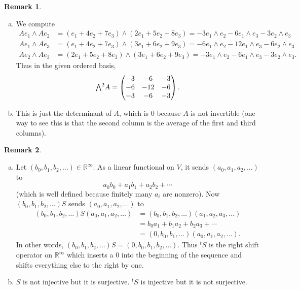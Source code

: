 \documentclass[11pt,oneside]{amsart}
\theoremstyle{definition}
\newtheorem{remark}{Remark}
\newcommand{\bR}{\mathbb{R}}
\newcommand{\extp}{\mathchoice{{\textstyle\bigwedge}}%
    {{\bigwedge}}%
    {{\textstyle\wedge}}%
    {{\scriptstyle\wedge}}}
\begin{document}
    \begin{remark}
        \leavevmode\begin{enumerate}[(a)]
            \item We compute
            \begin{align*}
                Ae_1\wedge Ae_2 &=(e_1+4e_2+7e_3)\wedge (2e_1+5e_2+8e_3)=-3e_1\wedge e_2-6e_1\wedge e_3-3e_2\wedge e_3\\
                Ae_1\wedge Ae_3 &=(e_1+4e_2+7e_3)\wedge (3e_1+6e_2+9e_3)=-6e_1\wedge e_2-12e_1\wedge e_3-6e_2\wedge e_3\\
                Ae_2\wedge Ae_3 &= (2e_1+5e_2+8e_3)\wedge (3e_1+6e_2+9e_3)=-3e_1\wedge e_2-6e_1\wedge e_3-3e_2\wedge e_3.
            \end{align*}
            Thus in the given ordered basis,
            \[\extp^2 A=\begin{pmatrix}
                -3&-6&-3\\
                -6&-12&-6\\
                -3&-6&-3
            \end{pmatrix}.\]
            \item This is just the determinant of $A$, which is 0 because $A$ is not invertible (one way to see this is that the second column is the average of the first and third columns).
        \end{enumerate}
    \end{remark}

    \begin{remark}
        \begin{enumerate}[(a)]
            \item Let $(b_0,b_1,b_2,\dots)\in\bR^\infty$. As a linear functional on $V$, it sends $(a_0,a_1,a_2,\dots)$ to
            \[a_0b_0+a_1b_1+a_2b_2+\cdots\]
            (which is well defined because finitely many $a_i$ are nonzero). Now $(b_0,b_1,b_2,\dots)S$ sends $(a_0,a_1,a_2,\dots)$ to
            \[\begin{split}
                (b_0,b_1,b_2,\dots)S(a_0,a_1,a_2,\dots) &=(b_0,b_1,b_2,\dots)(a_1,a_2,a_3,\dots)\\
                &=b_0a_1+b_1a_2+b_2a_3+\cdots\\
                &= (0,b_0,b_1,\dots)(a_0,a_1,a_2,\dots).
            \end{split}\]
            In other words, $(b_0,b_1,b_2,\dots)S=(0,b_0,b_1,b_2,\dots)$. Thus $^tS$ is the right shift operator on $\bR^\infty$ which inserts a 0 into the beginning of the sequence and shifts everything else to the right by one.
            \item $S$ is not injective but it is surjective. $^tS$ is injective but it is not surjective.
        \end{enumerate}
    \end{remark}
\end{document}
